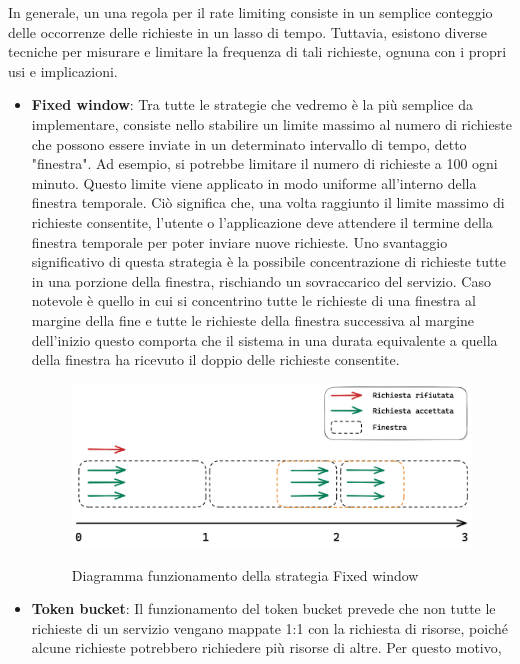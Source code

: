 In generale, un una regola per il rate limiting consiste in un semplice conteggio delle occorrenze delle richieste in un
lasso di tempo. Tuttavia, esistono diverse tecniche per misurare e limitare la frequenza di tali richieste, ognuna con i
propri usi e implicazioni.
\begin{itemize}
    \item \textbf{Fixed window}: Tra tutte le strategie che vedremo è la più semplice da implementare, consiste nello stabilire un
    limite massimo al numero di richieste che possono essere inviate in un determinato intervallo di tempo, detto
    "finestra". Ad esempio, si potrebbe limitare il numero di richieste a 100 ogni minuto. Questo limite viene applicato in
    modo uniforme all'interno della finestra temporale. Ciò significa che, una volta raggiunto il limite massimo di
    richieste consentite, l'utente o l'applicazione deve attendere il termine della finestra temporale per poter inviare
    nuove richieste. Uno svantaggio significativo di questa strategia è la possibile concentrazione di richieste tutte in
    una porzione della finestra, rischiando un sovraccarico del servizio. Caso notevole è quello in cui si concentrino tutte
    le richieste di una finestra al margine della fine e tutte le richieste della finestra successiva al margine dell’inizio
    questo comporta che il sistema in una durata equivalente a quella della finestra ha ricevuto il doppio delle richieste
    consentite.
    \begin{figure}[H]
        \centering
        \includegraphics[width=13cm]{./chapters/1.state-of-art/images/1.fixed_window.png}
        \label{fig:fixed-window}
        \captionsetup{justification=centering}
        \caption{Diagramma funzionamento della strategia Fixed window}
    \end{figure}
    \item \textbf{Token bucket}: Il funzionamento del token bucket prevede che non tutte le richieste di un servizio vengano mappate
    1:1 con la richiesta di risorse, poiché alcune richieste potrebbero richiedere più risorse di altre. Per questo motivo,

\end{itemize}
